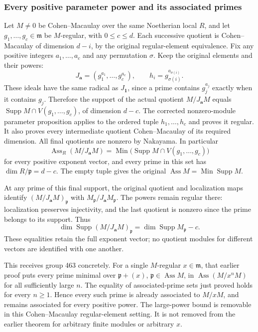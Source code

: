 \subsubsection{Every positive parameter power and its associated primes}\label{algebra-proof-019-every-positive-parameter-power-and-its-associated-primes}

Let \(M\ne0\) be Cohen--Macaulay over the same Noetherian local \(R\), and let \(g_1,\ldots,g_c\in\mathfrak m\) be \(M\)-regular, with \(0\le c\le d\). Each successive quotient is Cohen--Macaulay of dimension \(d-i\), by the original regular-element equivalence. Fix any positive integers \(a_1,\ldots,a_c\) and any permutation \(\sigma\). Keep the original elements and their powers: \[
 J_{\mathbf a}=(g_1^{a_1},\ldots,g_c^{a_c}),\qquad
 h_i=g_{\sigma(i)}^{a_{\sigma(i)}} .
\] These ideals have the same radical as \(J_{\mathbf 1}\), since a prime contains \(g_j^{a_j}\) exactly when it contains \(g_j\). Therefore the support of the actual quotient \(M/J_{\mathbf a}M\) equals \(\operatorname{Supp}M\cap V(g_1,\ldots,g_c)\), of dimension \(d-c\). The corrected nonzero-module parameter proposition applies to the ordered tuple \(h_1,\ldots,h_c\) and proves it regular. It also proves every intermediate quotient Cohen--Macaulay of its required dimension. All final quotients are nonzero by Nakayama. In particular \[
 \operatorname{Ass}_R(M/J_{\mathbf a}M)
 =\operatorname{Min}\bigl(\operatorname{Supp}M\cap V(g_1,\ldots,g_c)\bigr)
\] for every positive exponent vector, and every prime in this set has \(\dim R/\mathfrak p=d-c\). The empty tuple gives the original \(\operatorname{Ass}M=\operatorname{Min}\operatorname{Supp}M\).

At any prime of this final support, the original quotient and localization maps identify \((M/J_{\mathbf a}M)_{\mathfrak p}\) with \(M_{\mathfrak p}/J_{\mathbf a}M_{\mathfrak p}\). The powers remain regular there: localization preserves injectivity, and the last quotient is nonzero since the prime belongs to its support. Thus \[
 \dim\operatorname{Supp}(M/J_{\mathbf a}M)_{\mathfrak p}
 =\dim\operatorname{Supp}M_{\mathfrak p}-c .
\] These equalities retain the full exponent vector; no quotient modules for different vectors are identified with one another.

This receives group 463 concretely. For a single \(M\)-regular \(x\in\mathfrak m\), that earlier proof puts every prime minimal over \(\mathfrak p+(x)\), \(\mathfrak p\in\operatorname{Ass}M\), in \(\operatorname{Ass}(M/x^nM)\) for all sufficiently large \(n\). The equality of associated-prime sets just proved holds for every \(n\ge1\). Hence every such prime is already associated to \(M/xM\), and remains associated for every positive power. The large-power bound is removable in this Cohen--Macaulay regular-element setting. It is not removed from the earlier theorem for arbitrary finite modules or arbitrary \(x\).
